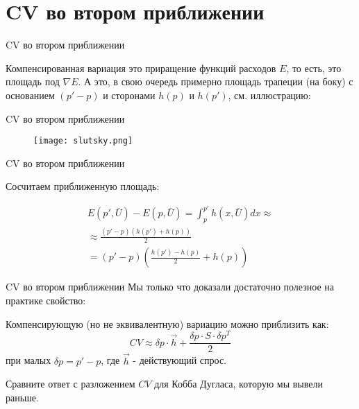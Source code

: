 \documentclass{beamer}
\begin{document}
\section{CV во втором приближении}

\begin{frame}{CV во втором приближении}

Компенсированная вариация это приращение функций расходов $E$, то есть, это площадь под $\nabla E$. А это, в свою очередь примерно площадь трапеции (на боку) с основанием $(p'-p)$ и сторонами $h(p)$ и $h(p')$, см. иллюстрацию:

\end{frame}

\begin{frame}{CV во втором приближении}

\begin{figure}[hbt]
\centering
\texttt{[image: slutsky.png]}
\end{figure}

\end{frame}

\begin{frame}{CV во втором приближении}

Сосчитаем приближенную площадь:

\begin{gather*}
E(p', \bar U) - E(p, \bar U) = \int_p^{p'} h(x, \bar U) dx \approx\\
\approx \frac{(p'-p)(h(p')+h(p))}{2}\\
 = (p'-p)(\frac{h(p') - h(p)}{2} + h(p))
\end{gather*}

\end{frame}

\begin{frame}{CV во втором приближении}
Мы только что доказали достаточно полезное на практике свойство:

\begin{lemma}
Компенсирующую (но не эквивалентную) вариацию можно приблизить как:
$$CV \approx \delta p \cdot \vec h + \frac{\delta p \cdot S \cdot \delta p^T}{2}$$
при малых $\delta p = p' - p$, где $\vec h$ - действующий спрос.
\end{lemma}

Сравните ответ с разложением $CV$ для Кобба Дугласа, которую мы вывели раньше.

\end{frame}
\end{document}
